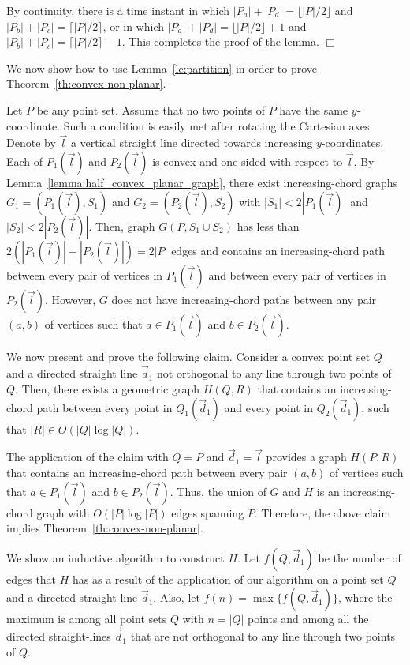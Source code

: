 \documentclass{llncs}
\renewenvironment{proof}
{{\bf Proof:}}{\hspace*{\fill}$\Box$\par\vspace{2mm}}
\begin{document}
\begin{proof}
By continuity, there is a time instant in which $|P_a|+|P_d|=\lfloor |P|/2\rfloor$ and $|P_b|+|P_c|=\lceil |P|/2 \rceil$, or in which $|P_a|+|P_d|=\lfloor |P|/2\rfloor +1$ and $|P_b|+|P_c|=\lceil |P|/2\rceil-1$. This completes the proof of the lemma.
\end{proof}

We now show how to use Lemma~\ref{le:partition} in order to prove Theorem~\ref{th:convex-non-planar}.

Let $P$ be any point set. Assume that no two points of $P$ have the same $y$-coordinate. Such a condition is easily met after rotating the Cartesian axes. Denote by $\vec l$ a vertical straight line directed towards increasing $y$-coordinates. Each of $P_1({\vec l})$ and $P_2({\vec l})$ is convex and one-sided with respect to $\vec l$. By Lemma~\ref{lemma:half_convex_planar_graph}, there exist increasing-chord graphs $G_1=(P_1({\vec l}),S_1)$ and $G_2=(P_2({\vec l}),S_2)$ with $|S_1|<2|P_1({\vec l})|$ and $|S_2|<2|P_2({\vec l})|$. Then, graph $G(P,S_1\cup S_2)$ has less than $2(|P_1({\vec l})|+|P_2({\vec l})|)=2|P|$ edges and contains an increasing-chord path between every pair of vertices in $P_1({\vec l})$ and between every pair of vertices in $P_2({\vec l})$. However, $G$ does not have increasing-chord paths between any pair $(a,b)$ of vertices such that $a\in P_1({\vec l})$ and $b\in P_2({\vec l})$.

We now present and prove the following claim. Consider a convex point set $Q$ and a directed straight line ${\vec d}_1$ not orthogonal to any line through two points of $Q$. Then, there exists a geometric graph $H(Q,R)$ that contains an increasing-chord path between every point in $Q_1({\vec d}_1)$ and every point in $Q_2({\vec d}_1)$, such that $|R|\in O(|Q|\log |Q|)$.

The application of the claim with $Q=P$ and ${\vec d}_1={\vec l}$ provides a graph $H(P,R)$ that contains an increasing-chord path between every pair $(a,b)$ of vertices such that $a\in P_1({\vec l})$ and $b\in P_2({\vec l})$. Thus, the union of $G$ and $H$ is an increasing-chord graph with $O(|P|\log |P|)$ edges spanning $P$. Therefore, the above claim implies Theorem~\ref{th:convex-non-planar}.

We show an inductive algorithm to construct $H$. Let $f(Q,{\vec d}_1)$ be the number of edges that $H$ has as a result of the application of our algorithm on a point set $Q$ and a directed straight-line ${\vec d}_1$. Also, let $f(n)=\max\{f(Q,{\vec d}_1)\}$, where the maximum is among all point sets $Q$ with $n=|Q|$ points and among all the directed straight-lines ${\vec d}_1$ that are not orthogonal to any line through two points of $Q$.
\end{document}
